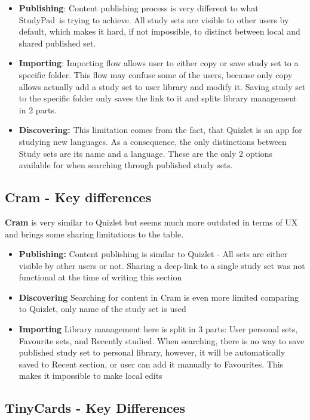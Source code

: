 \documentclass[thesis=B,english]{FITthesis}[2012/10/20]
\newcommand{\appname}{StudyPad}
\begin{document}
\begin{itemize}
	\item \textbf{Publishing}: Content publishing process is very different to what \appname\ is trying to achieve. All study sets are visible to other users by default, which makes it hard, if not impossible, to distinct between local and shared published set.
	\item \textbf{Importing}: Importing flow allows user to either copy or save study set to a specific folder. This flow may confuse some of the users, because only copy allows actually add a study set to user library and modify it. Saving study set to the specific folder only saves the link to it and splits library management in 2 parts.
	\item \textbf{Discovering:} This limitation comes from the fact, that Quizlet is an app for studying new languages. As a consequence, the only distinctions between Study sets are its name and a language. These are the only 2 options available for when searching through published study sets.

\end{itemize}

\subsection{Cram - Key differences}
\textbf{Cram} is very similar to Quizlet but seems much more outdated in terms of UX and brings some sharing limitations to the table.

\begin{itemize}
	\item  \textbf{Publishing:} Content publishing is similar to Quizlet - All sets are either visible by other users or not. Sharing a deep-link to a single study set was not functional at the time of writing this section
	\item \textbf{Discovering} Searching for content in Cram is even more limited comparing to Quizlet, only name of the study set is used
	\item \textbf{Importing} Library management here is split in 3 parts: User personal sets, Favourite sets, and Recently studied. When searching, there is no way to save published study set to personal library, however, it will be automatically saved to Recent section, or user can add it manually to Favourites. This makes it impossible to make local edits
\end{itemize}

\subsection{TinyCards - Key Differences}
\end{document}
